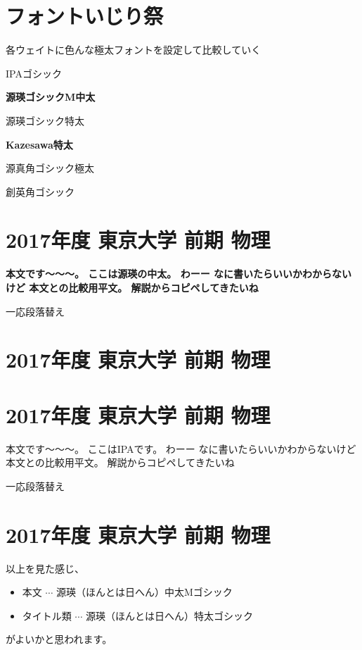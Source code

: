 \documentclass[dvipdfmx, a4paper, 14Q, fleqn]{jsarticle}
\begin{document}
\part*{フォントいじり祭}
各ウェイトに色んな極太フォントを設定して比較していく


IPAゴシック

{\mcfamily\bfseries 源瑛ゴシックM中太}

{\gtfamily\mdseries
源瑛ゴシック特太
}

{\gtfamily\bfseries
Kazesawa特太
}

{\gtfamily\ebseries
源真角ゴシック極太
}

{\mgfamily
創英角ゴシック
}


\part*{\sffamily\gtfamily\mdseries\huge \textbf{\textsf{2017}}年度 東京大学 前期 物理}		%

{\mcfamily\bfseries
本文です～～～。
ここは源瑛の中太。
わーー
なに書いたらいいかわからないけど
本文との比較用平文。
解説からコピペしてきたいね

一応段落替え
}


\part*{\sffamily\gtfamily\bfseries\huge 2017年度 東京大学 前期 物理}							%

\part*{\sffamily\gtfamily\ebseries\huge \textbf{\textsf{2017}}年度 東京大学 前期 物理}		%


本文です～～～。
ここはIPAです。
わーー
なに書いたらいいかわからないけど
本文との比較用平文。
解説からコピペしてきたいね

一応段落替え

\part*{\sffamily\mgfamily\huge \textbf{\textsf{2017}}年度 東京大学 前期 物理}					%

以上を見た感じ、

\begin{itemize}
\item 本文 $\cdots$ 源瑛（ほんとは日へん）中太Mゴシック
\item タイトル類 $\cdots$ 源瑛（ほんとは日へん）特太ゴシック
\end{itemize}

がよいかと思われます。
\end{document}
